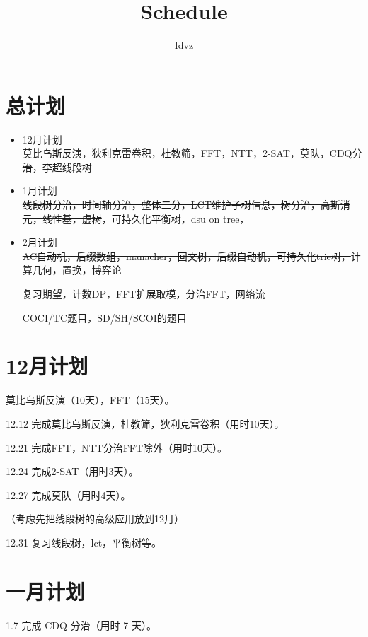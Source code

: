 \documentclass{ctexart}
\title{Schedule}
\author{Idvz}
\begin{document}
\date{}
\maketitle





\section{总计划}
\begin{itemize}
\item 12月计划\\
  \sout{莫比乌斯反演，狄利克雷卷积，杜教筛，FFT，NTT，2-SAT，莫队，CDQ分治}，李超线段树
\item 1月计划\\
  \sout{线段树分治，时间轴分治，整体二分，LCT维护子树信息，树分治，高斯消元，线性基，虚树}，可持久化平衡树，dsu on tree，
\item 2月计划\\
  \sout{AC自动机，后缀数组，manacher，回文树，后缀自动机，可持久化trie树，}计算几何，置换，博弈论

  复习期望，计数DP，FFT扩展取模，分治FFT，网络流
  
  COCI/TC题目，SD/SH/SCOI的题目
\end{itemize}
  

\section{12月计划}

莫比乌斯反演（10天），FFT（15天）。

12.12 完成莫比乌斯反演，杜教筛，狄利克雷卷积（用时10天）。

12.21 完成FFT，NTT\sout{分治FFT除外}（用时10天）。

12.24 完成2-SAT（用时3天）。

12.27 完成莫队（用时4天）。

（考虑先把线段树的高级应用放到12月）

12.31 复习线段树，lct，平衡树等。

\section{一月计划}

1.7 完成 CDQ 分治（用时 7 天）。
\end{document}
